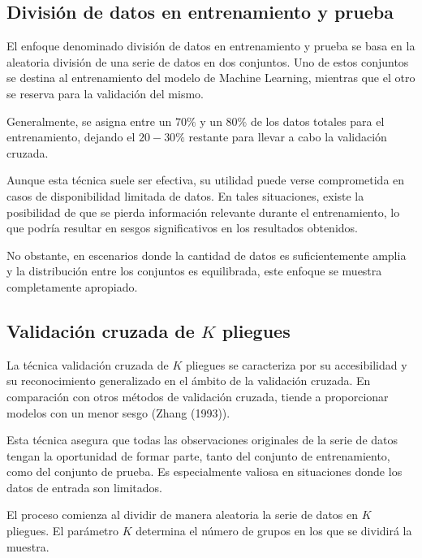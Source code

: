 \documentclass[
  us-letterpaper,
]{scrreprt}
\theoremstyle{plain}
\theoremstyle{definition}
\theoremstyle{definition}
\theoremstyle{plain}
\theoremstyle{remark}
\begin{document}
\subsection{División de datos en entrenamiento y
prueba}\label{divisiuxf3n-de-datos-en-entrenamiento-y-prueba}

El enfoque denominado división de datos en entrenamiento y prueba se
basa en la aleatoria división de una serie de datos en dos conjuntos.
Uno de estos conjuntos se destina al entrenamiento del modelo de Machine
Learning, mientras que el otro se reserva para la validación del mismo.

Generalmente, se asigna entre un \(70\%\) y un \(80\%\) de los datos
totales para el entrenamiento, dejando el \(20-30\%\) restante para
llevar a cabo la validación cruzada.

Aunque esta técnica suele ser efectiva, su utilidad puede verse
comprometida en casos de disponibilidad limitada de datos. En tales
situaciones, existe la posibilidad de que se pierda información
relevante durante el entrenamiento, lo que podría resultar en sesgos
significativos en los resultados obtenidos.

No obstante, en escenarios donde la cantidad de datos es suficientemente
amplia y la distribución entre los conjuntos es equilibrada, este
enfoque se muestra completamente apropiado.

\subsection{\texorpdfstring{Validación cruzada de \(K\)
pliegues}{Validación cruzada de K pliegues}}\label{sec-validaciuxf3n-cruzada-de-k-pliegues}

La técnica validación cruzada de \(K\) pliegues se caracteriza por su
accesibilidad y su reconocimiento generalizado en el ámbito de la
validación cruzada. En comparación con otros métodos de validación
cruzada, tiende a proporcionar modelos con un menor sesgo (Zhang
(1993)).

Esta técnica asegura que todas las observaciones originales de la serie
de datos tengan la oportunidad de formar parte, tanto del conjunto de
entrenamiento, como del conjunto de prueba. Es especialmente valiosa en
situaciones donde los datos de entrada son limitados.

El proceso comienza al dividir de manera aleatoria la serie de datos en
\(K\) pliegues. El parámetro \(K\) determina el número de grupos en los
que se dividirá la muestra.
\end{document}
